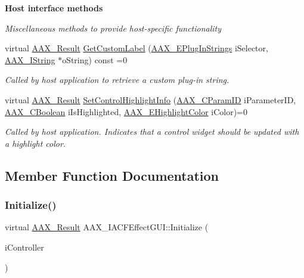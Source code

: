 \begin{Indent}\textbf{ Host interface methods}\par
{\em Miscellaneous methods to provide host-\/specific functionality }\begin{DoxyCompactItemize}
\item 
virtual \mbox{\hyperlink{a00392_a4d8f69a697df7f70c3a8e9b8ee130d2f}{A\+A\+X\+\_\+\+Result}} \mbox{\hyperlink{a01665_a81450c5272935689a4fb9c1820d6bba8}{Get\+Custom\+Label}} (\mbox{\hyperlink{a00491_a86f7310877399d9d4d2ea4863d472476}{A\+A\+X\+\_\+\+E\+Plug\+In\+Strings}} i\+Selector, \mbox{\hyperlink{a01873}{A\+A\+X\+\_\+\+I\+String}} $\ast$o\+String) const =0
\begin{DoxyCompactList}\small\item\em Called by host application to retrieve a custom plug-\/in string. \end{DoxyCompactList}\item 
virtual \mbox{\hyperlink{a00392_a4d8f69a697df7f70c3a8e9b8ee130d2f}{A\+A\+X\+\_\+\+Result}} \mbox{\hyperlink{a01665_a3922a4b9fef09e88440d7655422c2b96}{Set\+Control\+Highlight\+Info}} (\mbox{\hyperlink{a00392_a1440c756fe5cb158b78193b2fc1780d1}{A\+A\+X\+\_\+\+C\+Param\+ID}} i\+Parameter\+ID, \mbox{\hyperlink{a00392_aa216506530f1d19a2965931ced2b274b}{A\+A\+X\+\_\+\+C\+Boolean}} i\+Is\+Highlighted, \mbox{\hyperlink{a00491_a143056a07989a48e5db3a101f1b12567}{A\+A\+X\+\_\+\+E\+Highlight\+Color}} i\+Color)=0
\begin{DoxyCompactList}\small\item\em Called by host application. Indicates that a control widget should be updated with a highlight color. \end{DoxyCompactList}\end{DoxyCompactItemize}
\end{Indent}


\subsection{Member Function Documentation}
\mbox{\label{a01665_aac9d8ab88172ac594d86ac2441522fec}} 
\subsubsection{\texorpdfstring{Initialize()}{Initialize()}}
{\footnotesize\ttfamily virtual \mbox{\hyperlink{a00392_a4d8f69a697df7f70c3a8e9b8ee130d2f}{A\+A\+X\+\_\+\+Result}} A\+A\+X\+\_\+\+I\+A\+C\+F\+Effect\+G\+U\+I\+::\+Initialize (\begin{DoxyParamCaption}\item[{\mbox{\hyperlink{a01409}{I\+A\+C\+F\+Unknown}} $\ast$}]{i\+Controller }\end{DoxyParamCaption})\hspace{0.3cm}{\ttfamily [pure virtual]}}



